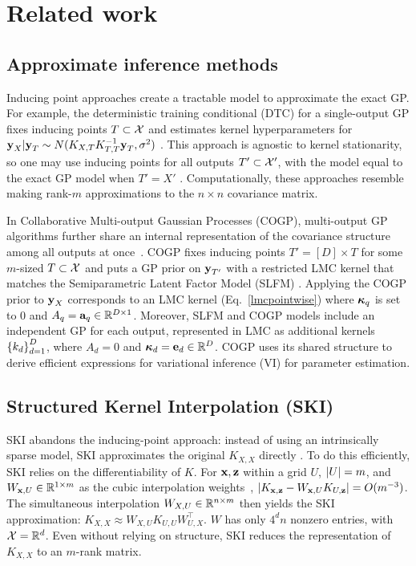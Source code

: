 \documentclass[twoside]{article}
\begin{document}
\section{Related work}
\label{sec:related-work}
\subsection{Approximate inference methods}

Inducing point approaches create a tractable model to approximate the exact GP. For example, the deterministic training conditional (DTC) for a single-output GP fixes inducing points $T\subset\mathcal{X}$ and estimates kernel hyperparameters for $\textbf{y}_{X}|\textbf{y}_{T}\sim N(K_{X,T}K_{T,T}^{-1}\textbf{y}_T,\sigma^2)$ \citep{quinonero2005unifying}. This approach is agnostic to kernel stationarity, so one may use inducing points for all outputs $T'\subset \mathcal{X}'$, with the model equal to the exact GP model when $T'={X'}$ \citep{alvarez2010efficient}. Computationally, these approaches resemble making rank-$m$ approximations to the $n\times n$ covariance matrix.

In Collaborative Multi-output Gaussian Processes (COGP), multi-output GP algorithms further share an internal representation of the covariance structure among all outputs at once~\citep{nguyen2014collaborative}. COGP fixes inducing points ${T'}=[D]\times T$ for some $m$-sized $T\subset \mathcal{X}$ and puts a GP prior on $\textbf{y}_{{T'}}$ with a restricted LMC kernel that matches the Semiparametric Latent Factor Model (SLFM) \citep{seeger2005semiparametric}. Applying the COGP prior to $\textbf{y}_X$ corresponds to an LMC kernel (Eq.~\ref{lmcpointwise}) where ${\boldsymbol\kappa}_q$ is set to 0 and $A_q=\textbf{a}_q\in\mathbb{R}^{D\times 1}$. Moreover, SLFM and COGP models include an independent GP for each output, represented in LMC as additional kernels $\left\{ k_d \right\}_{ d=1 }^{ D }$, where $A_d=0$ and ${\boldsymbol\kappa}_d=\textbf{e}_d\in\mathbb{R}^D$. COGP uses its shared structure to derive efficient expressions for variational inference (VI) for parameter estimation.

\subsection{Structured Kernel Interpolation (SKI)}\label{ski-section}

SKI abandons the inducing-point approach: instead of using an intrinsically sparse model, SKI approximates the original $K_{X,X}$ directly \citep{kiss-gp}. To do this efficiently, SKI relies on the differentiability of $K$. For $\textbf{x},\textbf{z}$ within a grid $U$, $\left\vert{U}\right\vert=m$, and $W_{\textbf{x},U}\in\mathbb{R}^{1\times m}$ as the cubic interpolation weights~\citep{keys1981cubic}, $\left|K_{\textbf{x},\textbf{z}}-W_{\textbf{x},U}K_{U,\textbf{z}}\right|=O(m^{-3})$. The simultaneous interpolation $W_{X,U}\in\mathbb{R}^{n\times m}$ then yields the SKI approximation: $K_{X,X}\approx W_{X,U}K_{U,U}W_{U,X}^\top$. $W$ has only $4^dn$ nonzero entries, with $\mathcal{X}=\mathbb{R}^d$. Even without relying on structure, SKI reduces the representation of $K_{X,X}$ to an $m$-rank matrix.
\end{document}
